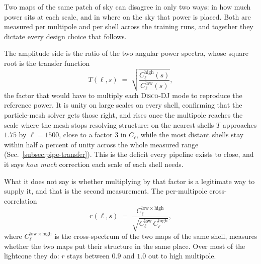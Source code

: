 \documentclass{report}
\begin{document}
Two maps of the same patch of sky can disagree in only two ways: in how much power sits at each
scale, and in where on the sky that power is placed. Both are measured per multipole and per shell
across the training runs, and together they dictate every
design choice that follows.

The amplitude side is the ratio of the two angular power spectra, whose square root is the transfer
function \cite{feng_fastpm_2016, garrison_improving_2016}
\begin{equation}
  T(\ell, s) \;=\; \sqrt{\frac{C_\ell^{\mathrm{high}}(s)}{C_\ell^{\mathrm{low}}(s)}},
  \label{eq:transfer_meas}
\end{equation}
the factor that would have to multiply
each \textsc{Disco-DJ} mode to reproduce the reference power. It is unity on large scales on every
shell, confirming that the particle-mesh solver gets those right, and rises once the multipole reaches
the scale where the mesh stops resolving structure: on the nearest shells \mbox{$T$} approaches
\mbox{$1.75$} by \mbox{$\ell = 1500$}, close to a factor \mbox{$3$} in \mbox{$C_\ell$}, while the most
distant shells stay within half a percent of unity across the whole measured range
(Sec.~\ref{subsec:pipe-transfer}). This is the deficit every pipeline exists to close, and it says
\emph{how much} correction each scale of each shell needs.

What it does not say is whether multiplying by that factor is a legitimate way to supply it, and that is
the second measurement. The per-multipole cross-correlation \cite{feng_fastpm_2016}
\begin{equation}
  r(\ell, s) \;=\; \frac{ C_\ell^{\mathrm{low}\times\mathrm{high}}}{\sqrt{ C_\ell^{\mathrm{low}}\, C_\ell^{\mathrm{high}}}},
  \label{eq:phase_corr}
\end{equation}
where \mbox{$C_\ell^{\mathrm{low}\times\mathrm{high}}$} is the cross-spectrum of the two maps of the same shell, measures whether the two maps put their structure in the same place. Over most of the lightcone they do: \mbox{$r$} stays between \mbox{$0.9$} and \mbox{$1.0$} out to high multipole.
\end{document}
